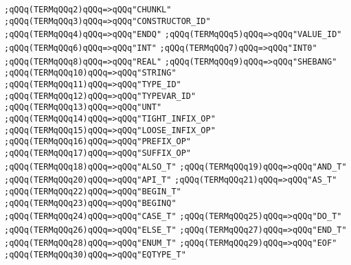 \verb|;qQQq(TERMqQQq2)qQQq=>qQQq"CHUNKL"|\newline
\verb|;qQQq(TERMqQQq3)qQQq=>qQQq"CONSTRUCTOR_ID"|\newline
\verb|;qQQq(TERMqQQq4)qQQq=>qQQq"ENDQ"|\newline
\verb|;qQQq(TERMqQQq5)qQQq=>qQQq"VALUE_ID"|\newline
\verb|;qQQq(TERMqQQq6)qQQq=>qQQq"INT"|\newline
\verb|;qQQq(TERMqQQq7)qQQq=>qQQq"INT0"|\newline
\verb|;qQQq(TERMqQQq8)qQQq=>qQQq"REAL"|\newline
\verb|;qQQq(TERMqQQq9)qQQq=>qQQq"SHEBANG"|\newline
\verb|;qQQq(TERMqQQq10)qQQq=>qQQq"STRING"|\newline
\verb|;qQQq(TERMqQQq11)qQQq=>qQQq"TYPE_ID"|\newline
\verb|;qQQq(TERMqQQq12)qQQq=>qQQq"TYPEVAR_ID"|\newline
\verb|;qQQq(TERMqQQq13)qQQq=>qQQq"UNT"|\newline
\verb|;qQQq(TERMqQQq14)qQQq=>qQQq"TIGHT_INFIX_OP"|\newline
\verb|;qQQq(TERMqQQq15)qQQq=>qQQq"LOOSE_INFIX_OP"|\newline
\verb|;qQQq(TERMqQQq16)qQQq=>qQQq"PREFIX_OP"|\newline
\verb|;qQQq(TERMqQQq17)qQQq=>qQQq"SUFFIX_OP"|\newline
\verb|;qQQq(TERMqQQq18)qQQq=>qQQq"ALSO_T"|\newline
\verb|;qQQq(TERMqQQq19)qQQq=>qQQq"AND_T"|\newline
\verb|;qQQq(TERMqQQq20)qQQq=>qQQq"API_T"|\newline
\verb|;qQQq(TERMqQQq21)qQQq=>qQQq"AS_T"|\newline
\verb|;qQQq(TERMqQQq22)qQQq=>qQQq"BEGIN_T"|\newline
\verb|;qQQq(TERMqQQq23)qQQq=>qQQq"BEGINQ"|\newline
\verb|;qQQq(TERMqQQq24)qQQq=>qQQq"CASE_T"|\newline
\verb|;qQQq(TERMqQQq25)qQQq=>qQQq"DO_T"|\newline
\verb|;qQQq(TERMqQQq26)qQQq=>qQQq"ELSE_T"|\newline
\verb|;qQQq(TERMqQQq27)qQQq=>qQQq"END_T"|\newline
\verb|;qQQq(TERMqQQq28)qQQq=>qQQq"ENUM_T"|\newline
\verb|;qQQq(TERMqQQq29)qQQq=>qQQq"EOF"|\newline
\verb|;qQQq(TERMqQQq30)qQQq=>qQQq"EQTYPE_T"|\newline
